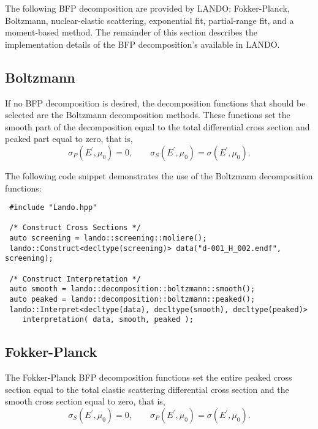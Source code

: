 \documentclass[../main.tex]{subfiles}
\begin{document}
The following BFP decomposition are provided by LANDO: Fokker-Planck, Boltzmann, nuclear-elastic scattering, exponential fit, partial-range fit, and a moment-based method. The remainder of this section describes the implementation details of the BFP decomposition's available in LANDO.

\subsection{Boltzmann}
If no BFP decomposition is desired, the decomposition functions that should be selected are the Boltzmann decomposition methods. These functions set the smooth part of the decomposition equal to the total differential cross section and peaked part equal to zero, that is,
\begin{equation}
    \sigma_P(E^{\prime},\mu_0) = 0, \quad \quad \sigma_S(E^{\prime},\mu_0) = \sigma(E^{\prime},\mu_0).
\end{equation}

The following code snippet demonstrates the use of the Boltzmann decomposition functions:
\begin{verbatim}
 #include "Lando.hpp"

 /* Construct Cross Sections */
 auto screening = lando::screening::moliere();
 lando::Construct<decltype(screening)> data("d-001_H_002.endf", screening);
 
 /* Construct Interpretation */
 auto smooth = lando::decomposition::boltzmann::smooth();
 auto peaked = lando::decomposition::boltzmann::peaked();
 lando::Interpret<decltype(data), decltype(smooth), decltype(peaked)> 
    interpretation( data, smooth, peaked );
\end{verbatim}

\subsection{Fokker-Planck}
The Fokker-Planck BFP decomposition functions set the entire peaked cross section equal to the total elastic scattering differential cross section and the smooth cross section equal to zero, that is,
\begin{equation}
    \sigma_S(E^{\prime},\mu_0) = 0, \quad \quad \sigma_P(E^{\prime},\mu_0) = \sigma(E^{\prime},\mu_0).
\end{equation}
\end{document}
